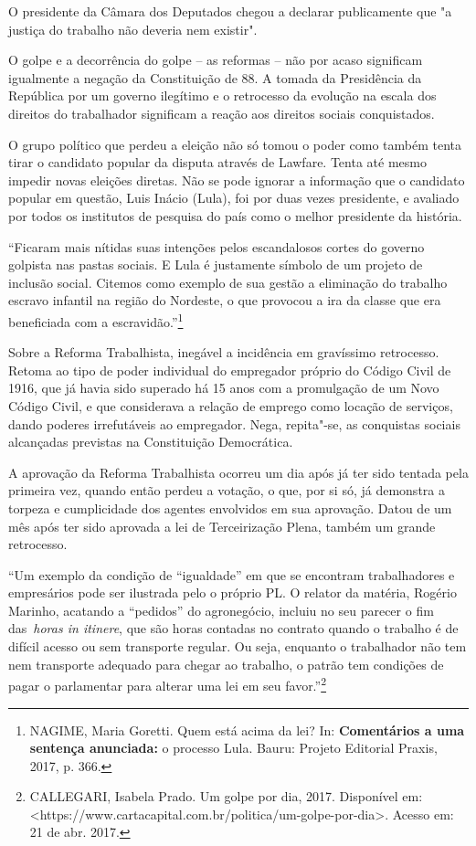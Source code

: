 O presidente da Câmara dos Deputados chegou a declarar publicamente que
"a justiça do trabalho não deveria nem existir".

O golpe e a decorrência do golpe -- as reformas -- não por acaso
significam igualmente a negação da Constituição de 88. A tomada da
Presidência da República por um governo ilegítimo e o retrocesso da
evolução na escala dos direitos do trabalhador significam a reação aos
direitos sociais conquistados.

O grupo político que perdeu a eleição não só tomou o poder como também
tenta tirar o candidato popular da disputa através de Lawfare. Tenta até
mesmo impedir novas eleições diretas. Não se pode ignorar a informação
que o candidato popular em questão, Luis Inácio (Lula), foi por duas
vezes presidente, e avaliado por todos os institutos de pesquisa do país
como o melhor presidente da história.

``Ficaram mais nítidas suas intenções pelos escandalosos cortes do
governo golpista nas pastas sociais. E Lula é justamente símbolo de um
projeto de inclusão social. Citemos como exemplo de sua gestão a
eliminação do trabalho escravo infantil na região do Nordeste, o que
provocou a ira da classe que era beneficiada com a
escravidão.''\footnote{NAGIME, Maria Goretti. Quem está acima da lei?
  In: \textbf{Comentários a uma sentença anunciada:} o processo Lula.
  Bauru: Projeto Editorial Praxis, 2017, p. 366.}

Sobre a Reforma Trabalhista, inegável a incidência em gravíssimo
retrocesso. Retoma ao tipo de poder individual do empregador próprio do
Código Civil de 1916, que já havia sido superado há 15 anos com a
promulgação de um Novo Código Civil, e que considerava a relação de
emprego como locação de serviços, dando poderes irrefutáveis ao
empregador. Nega, repita"-se, as conquistas sociais alcançadas previstas
na Constituição Democrática.

A aprovação da Reforma Trabalhista ocorreu um dia após já ter sido
tentada pela primeira vez, quando então perdeu a votação, o que, por si
só, já demonstra a torpeza e cumplicidade dos agentes envolvidos em sua
aprovação. Datou de um mês após ter sido aprovada a lei de Terceirização
Plena, também um grande retrocesso.

``Um exemplo da condição de ``igualdade'' em que se encontram
trabalhadores e empresários pode ser ilustrada pelo o próprio PL. O
relator da matéria, Rogério Marinho, acatando a ``pedidos'' do
agronegócio, incluiu no seu parecer o fim das~\emph{horas in itinere},
que são horas contadas no contrato quando o trabalho é de difícil acesso
ou sem transporte regular. Ou seja, enquanto o trabalhador não tem nem
transporte adequado para chegar ao trabalho, o patrão tem condições de
pagar o parlamentar para alterar uma lei em seu favor.''\footnote{CALLEGARI,
  Isabela Prado. Um golpe por dia, 2017. Disponível
  em:\textless{}https://www.cartacapital.com.br/politica/um-golpe-por-dia\textgreater{}.
  Acesso em: 21 de abr. 2017.}

